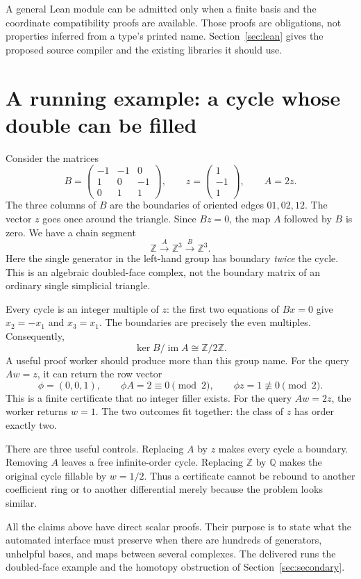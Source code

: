 \documentclass[11pt,letterpaper]{article}
\theoremstyle{definition}\newtheorem{definition}[theorem]{Definition}
\theoremstyle{remark}\newtheorem{remark}[theorem]{Remark}
\newcommand{\Z}{\mathbb Z}\newcommand{\Q}{\mathbb Q}
\newcommand{\im}{\operatorname{im}}\newcommand{\rank}{\operatorname{rank}}
\newcommand{\code}[1]{\texttt{\detokenize{#1}}}
\begin{document}
A general Lean module can be admitted only when a finite basis and the
coordinate compatibility proofs are available. Those proofs are obligations,
not properties inferred from a type's printed name. Section~\ref{sec:lean}
gives the proposed source compiler and the existing libraries it should use.

\section{A running example: a cycle whose double can be filled}
\label{sec:example}

Consider the matrices
\[
 B=\begin{pmatrix}-1&-1&0\\1&0&-1\\0&1&1\end{pmatrix},\qquad
 z=\begin{pmatrix}1\\-1\\1\end{pmatrix},\qquad A=2z.
\]
The three columns of $B$ are the boundaries of oriented edges $01,02,12$.
The vector $z$ goes once around the triangle. Since $Bz=0$, the map $A$ followed
by $B$ is zero. We have a chain segment
\[
  \Z\xrightarrow{A}\Z^3\xrightarrow{B}\Z^3.
\]
Here the single generator in the left-hand group has boundary \emph{twice} the
cycle. This is an algebraic doubled-face complex, not the boundary matrix of an
ordinary single simplicial triangle.

Every cycle is an integer multiple of $z$: the first two equations of $Bx=0$
give $x_2=-x_1$ and $x_3=x_1$. The boundaries are precisely the even multiples.
Consequently,
\[
  \ker B/\im A\cong\Z/2\Z.
\]
A useful proof worker should produce more than this group name. For the query
$Aw=z$, it can return the row vector
\[
 \phi=(0,0,1),\qquad \phi A=2\equiv0\pmod2,\qquad
 \phi z=1\not\equiv0\pmod2.
\]
This is a finite certificate that no integer filler exists. For the query
$Aw=2z$, the worker returns $w=1$. The two outcomes fit together: the class of
$z$ has order exactly two.

There are three useful controls. Replacing $A$ by $z$ makes every cycle a
boundary. Removing $A$ leaves a free infinite-order cycle. Replacing $\Z$ by
$\Q$ makes the original cycle fillable by $w=1/2$. Thus a certificate cannot be
rebound to another coefficient ring or to another differential merely because
the problem looks similar.

All the claims above have direct scalar proofs. Their purpose is to state what
the automated interface must preserve when there are hundreds of generators,
unhelpful bases, and maps between several complexes. The delivered
\code{demo.py} runs the doubled-face example and the homotopy obstruction of
Section~\ref{sec:secondary}.
\end{document}
